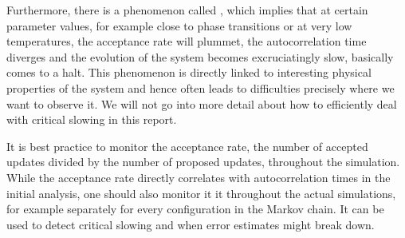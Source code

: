 Furthermore, there is a phenomenon called , which
implies that at certain parameter values, for example close to phase transitions
or at very low temperatures, the acceptance rate will plummet, the
autocorrelation time diverges and the evolution of the system becomes
excruciatingly slow, basically comes to a halt. This phenomenon is directly
linked to interesting physical properties of the system and hence often leads to
difficulties precisely where we want to observe it. We will not go into more
detail about how to efficiently deal with critical slowing in this report.

It is best practice to monitor the acceptance rate, \ie{} the number of accepted
updates divided by the number of proposed updates, throughout the simulation.
While the acceptance rate directly correlates with autocorrelation times in the
initial analysis, one should also monitor it it throughout the actual
simulations, for example separately for every configuration in the Markov chain.
It can be used to detect critical slowing and when error estimates might break
down.
